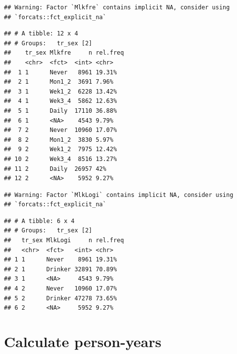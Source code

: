 \documentclass[]{article}
\newenvironment{Shaded}{\begin{snugshade}}{\end{snugshade}}
\newcommand{\DataTypeTok}[1]{\textcolor[rgb]{0.13,0.29,0.53}{#1}}
\newcommand{\DecValTok}[1]{\textcolor[rgb]{0.00,0.00,0.81}{#1}}
\newcommand{\KeywordTok}[1]{\textcolor[rgb]{0.13,0.29,0.53}{\textbf{#1}}}
\newcommand{\NormalTok}[1]{#1}
\newcommand{\OperatorTok}[1]{\textcolor[rgb]{0.81,0.36,0.00}{\textbf{#1}}}
\newcommand{\StringTok}[1]{\textcolor[rgb]{0.31,0.60,0.02}{#1}}
\begin{document}
\begin{verbatim}
## Warning: Factor `Mlkfre` contains implicit NA, consider using
## `forcats::fct_explicit_na`
\end{verbatim}

\begin{verbatim}
## # A tibble: 12 x 4
## # Groups:   tr_sex [2]
##    tr_sex Mlkfre     n rel.freq
##    <chr>  <fct>  <int> <chr>   
##  1 1      Never   8961 19.31%  
##  2 1      Mon1_2  3691 7.96%   
##  3 1      Wek1_2  6228 13.42%  
##  4 1      Wek3_4  5862 12.63%  
##  5 1      Daily  17110 36.88%  
##  6 1      <NA>    4543 9.79%   
##  7 2      Never  10960 17.07%  
##  8 2      Mon1_2  3830 5.97%   
##  9 2      Wek1_2  7975 12.42%  
## 10 2      Wek3_4  8516 13.27%  
## 11 2      Daily  26957 42%     
## 12 2      <NA>    5952 9.27%
\end{verbatim}

\begin{Shaded}
\end{Shaded}

\begin{verbatim}
## Warning: Factor `MlkLogi` contains implicit NA, consider using
## `forcats::fct_explicit_na`
\end{verbatim}

\begin{verbatim}
## # A tibble: 6 x 4
## # Groups:   tr_sex [2]
##   tr_sex MlkLogi     n rel.freq
##   <chr>  <fct>   <int> <chr>   
## 1 1      Never    8961 19.31%  
## 2 1      Drinker 32891 70.89%  
## 3 1      <NA>     4543 9.79%   
## 4 2      Never   10960 17.07%  
## 5 2      Drinker 47278 73.65%  
## 6 2      <NA>     5952 9.27%
\end{verbatim}

\hypertarget{calculate-person-years}{%
\section{Calculate person-years}\label{calculate-person-years}}
\end{document}
